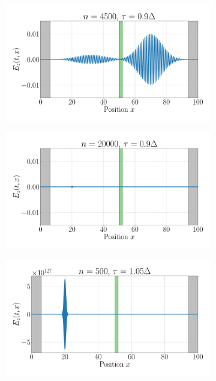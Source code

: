 \documentclass[11pt, A4paper]{article}
\begin{document}
\begin{figure}[h!]
\begin{subfigure}[h]{0.499\textwidth}
         \caption{}
         \label{fig: thin_n3505_tau09}
     \end{subfigure}
     \begin{subfigure}[h]{0.499\textwidth}
         \centering
         \includegraphics[width=\textwidth]{Plots/maxwell_tau0.9_thinglass_nmax4500.pdf}
         \caption{}
         \label{fig: thin_t80_tau09}
     \end{subfigure}
     \begin{subfigure}[h]{0.499\textwidth}
         \centering
         \includegraphics[width=\textwidth]{Plots/maxwell_tau0.9_thinglass_nmax20000.pdf}
         \caption{}
         \label{fig: thin_t500_tau09}
     \end{subfigure}
     \begin{subfigure}[h]{0.499\textwidth}
         \centering
         \includegraphics[width=\textwidth]{Plots/maxwell_tau1.05_thinglass_nmax500.pdf}

\end{subfigure}
\end{figure}
\end{document}
